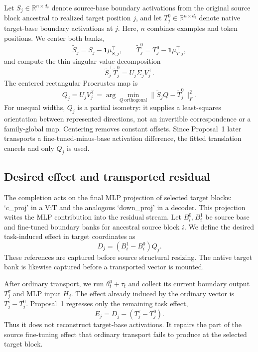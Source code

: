 \documentclass[10pt]{article}
\begin{document}
Let $S_j\in\mathbb{R}^{n\times d_s}$ denote source-base boundary activations from the original source block ancestral to realized target position $j$, and let $T_j^0\in\mathbb{R}^{n\times d_t}$ denote native target-base boundary activations at $j$. Here, $n$ combines examples and token positions. We center both banks,
\begin{equation}
 \widetilde S_j=S_j-\mathbf{1}\mu_{S,j}^{\top},\qquad
 \widetilde T_j^0=T_j^0-\mathbf{1}\mu_{T,j}^{\top},
\end{equation}
and compute the thin singular value decomposition
\begin{equation}
 \widetilde S_j^{\top}\widetilde T_j^0=U_j\Sigma_jV_j^{\top}.
\end{equation}
The centered rectangular Procrustes map is
\begin{equation}
 Q_j=U_jV_j^{\top}
 =\arg\min_{Q\,\mathrm{orthogonal}}\|\widetilde S_jQ-\widetilde T_j^0\|_F^2.
 \label{eq:procrustes}
\end{equation}
For unequal widths, $Q_j$ is a partial isometry: it supplies a least-squares orientation between represented directions, not an invertible correspondence or a family-global map. Centering removes constant offsets. Since Proposal~1 later transports a fine-tuned-minus-base activation difference, the fitted translation cancels and only $Q_j$ is used.

\subsection{Desired effect and transported residual}
The completion acts on the final MLP projection of selected target blocks: `c\_proj' in a ViT and the analogous `down\_proj' in a decoder. This projection writes the MLP contribution into the residual stream. Let $B_i^0,B_i^1$ be source base and fine-tuned boundary banks for ancestral source block $i$. We define the desired task-induced effect in target coordinates as
\begin{equation}
 D_j=(B_i^1-B_i^0)Q_j.
 \label{eq:desired}
\end{equation}
These references are captured before source structural resizing. The native target bank is likewise captured before a transported vector is mounted.

After ordinary transport, we run $\theta_t^0+\tau_t$ and collect its current boundary output $T_j^{\tau}$ and MLP input $H_j$. The effect already induced by the ordinary vector is $T_j^{\tau}-T_j^0$. Proposal~1 regresses only the remaining task effect,
\begin{equation}
 E_j=D_j-(T_j^{\tau}-T_j^0).
 \label{eq:residual}
\end{equation}
Thus it does not reconstruct target-base activations. It repairs the part of the source fine-tuning effect that ordinary transport fails to produce at the selected target block.
\end{document}
